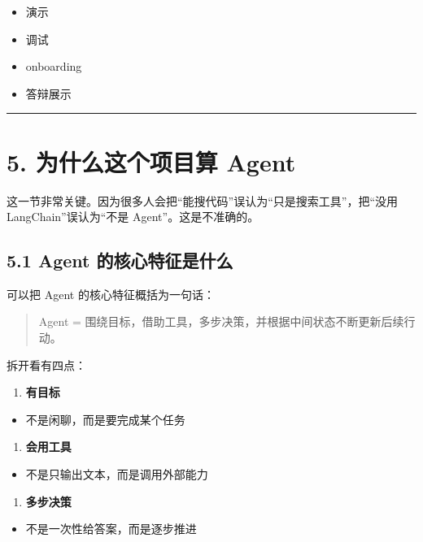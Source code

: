 \documentclass[UTF8,12pt,openany]{ctexbook}
\begin{document}
\begin{itemize}
\item 演示
\item 调试
\item onboarding
\item 答辩展示
\end{itemize}

\hrule

\section{5. 为什么这个项目算 Agent}

这一节非常关键。因为很多人会把“能搜代码”误认为“只是搜索工具”，把“没用 LangChain”误认为“不是 Agent”。这是不准确的。\par

\subsection{5.1 Agent 的核心特征是什么}

可以把 Agent 的核心特征概括为一句话：\par

\begin{quote}
Agent = 围绕目标，借助工具，多步决策，并根据中间状态不断更新后续行动。
\end{quote}

拆开看有四点：\par

\begin{enumerate}
\item \textbf{有目标}
\end{enumerate}
\begin{itemize}
\item 不是闲聊，而是要完成某个任务
\end{itemize}

\begin{enumerate}
\item \textbf{会用工具}
\end{enumerate}
\begin{itemize}
\item 不是只输出文本，而是调用外部能力
\end{itemize}

\begin{enumerate}
\item \textbf{多步决策}
\end{enumerate}
\begin{itemize}
\item 不是一次性给答案，而是逐步推进
\end{itemize}
\end{document}
